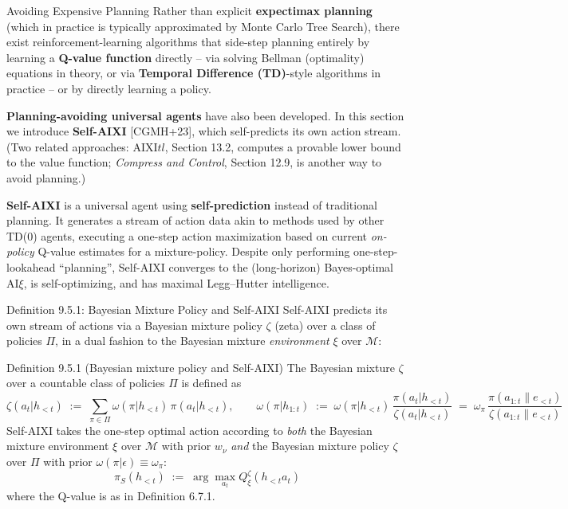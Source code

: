 \documentclass[aspectratio=169,10pt]{beamer}
\begin{document}
\begin{frame}{Avoiding Expensive Planning}
  Rather than explicit \textbf{expectimax planning} (which in practice is
  typically approximated by Monte Carlo Tree Search), there exist
  reinforcement-learning algorithms that side-step planning entirely by
  learning a \textbf{Q-value function} directly -- via solving Bellman
  (optimality) equations in theory, or via \textbf{Temporal Difference
  (TD)}-style algorithms in practice -- or by directly learning a policy.

  \vspace{0.4em}
  \textbf{Planning-avoiding universal agents} have also been developed. In
  this section we introduce \textbf{Self-AIXI} [CGMH+23], which
  self-predicts its own action stream. (Two related approaches: AIXI$tl$,
  Section 13.2, computes a provable lower bound to the value function;
  \emph{Compress and Control}, Section 12.9, is another way to avoid
  planning.)

  \vspace{0.4em}
  \textbf{Self-AIXI} is a universal agent using \textbf{self-prediction}
  instead of traditional planning. It generates a stream of action data
  akin to methods used by other TD(0) agents, executing a one-step action
  maximization based on current \emph{on-policy} Q-value estimates for a
  mixture-policy. Despite only performing one-step-lookahead ``planning'',
  Self-AIXI converges to the (long-horizon) Bayes-optimal $\mathrm{AI}\xi$,
  is self-optimizing, and has maximal Legg--Hutter intelligence.
\end{frame}

\begin{frame}{Definition 9.5.1: Bayesian Mixture Policy and Self-AIXI}
  Self-AIXI predicts its own stream of actions via a Bayesian mixture
  policy $\zeta$ (zeta) over a class of policies $\Pi$, in a dual fashion
  to the Bayesian mixture \emph{environment} $\xi$ over $\mathcal{M}$:
  \begin{block}{Definition 9.5.1 (Bayesian mixture policy and Self-AIXI)}
    The Bayesian mixture $\zeta$ over a countable class of policies $\Pi$
    is defined as
    \[
      \zeta(a_t|h_{<t}) \;:=\; \sum_{\pi\in\Pi} \omega(\pi|h_{<t})\,\pi(a_t|h_{<t}), \qquad
      \omega(\pi|h_{1:t}) \;:=\; \omega(\pi|h_{<t})\,\frac{\pi(a_t|h_{<t})}{\zeta(a_t|h_{<t})} \;=\; \omega_\pi\,\frac{\pi(a_{1:t}\|e_{<t})}{\zeta(a_{1:t}\|e_{<t})}
    \]
    Self-AIXI takes the one-step optimal action according to \emph{both}
    the Bayesian mixture environment $\xi$ over $\mathcal{M}$ with prior
    $w_\nu$ \emph{and} the Bayesian mixture policy $\zeta$ over $\Pi$ with
    prior $\omega(\pi|\epsilon)\equiv\omega_\pi$:
    \[
      \pi_S(h_{<t}) \;:=\; \arg\max_{a_t} Q^\zeta_\xi(h_{<t}a_t)
    \]
    where the Q-value is as in Definition 6.7.1.
  \end{block}
\end{frame}
\end{document}
